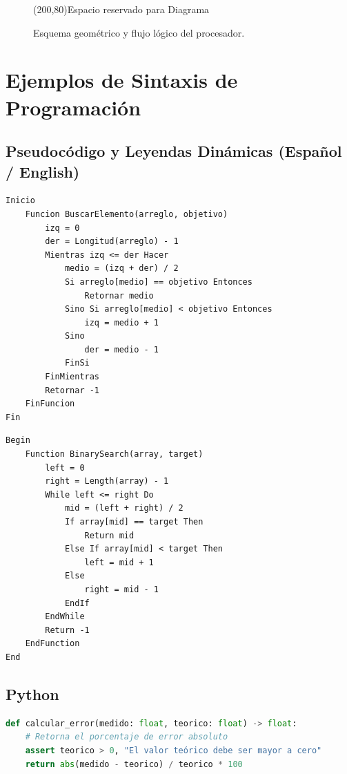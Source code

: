 \documentclass[11pt, a4paper]{article}
\begin{document}
\begin{figure}[h]
\centering
\framebox(200,80){Espacio reservado para Diagrama}
\caption{Esquema geométrico y flujo lógico del procesador.}
\label{fig:ejemplo}
\end{figure}

\newpage
\section{Ejemplos de Sintaxis de Programación}

\subsection{Pseudocódigo y Leyendas Dinámicas (Español / English)}

\begin{lstlisting}[language=Pseudocodigo, caption={Estructura básica de una búsqueda binaria en pseudocódigo.}]
Inicio
    Funcion BuscarElemento(arreglo, objetivo)
        izq = 0
        der = Longitud(arreglo) - 1
        Mientras izq <= der Hacer
            medio = (izq + der) / 2
            Si arreglo[medio] == objetivo Entonces
                Retornar medio
            Sino Si arreglo[medio] < objetivo Entonces
                izq = medio + 1
            Sino
                der = medio - 1
            FinSi
        FinMientras
        Retornar -1
    FinFuncion
Fin
\end{lstlisting}

\begin{otherlanguage}{english}
\begin{lstlisting}[language=Pseudocode, caption={Basic binary search structure in pseudocode.}]
Begin
    Function BinarySearch(array, target)
        left = 0
        right = Length(array) - 1
        While left <= right Do
            mid = (left + right) / 2
            If array[mid] == target Then
                Return mid
            Else If array[mid] < target Then
                left = mid + 1
            Else
                right = mid - 1
            EndIf
        EndWhile
        Return -1
    EndFunction
End
\end{lstlisting}
\end{otherlanguage}

\subsection{Python}
\begin{lstlisting}[language=Python, caption={Calculo de error de latencia en Python.}]
def calcular_error(medido: float, teorico: float) -> float:
    # Retorna el porcentaje de error absoluto
    assert teorico > 0, "El valor teórico debe ser mayor a cero"
    return abs(medido - teorico) / teorico * 100
\end{lstlisting}
\end{document}

